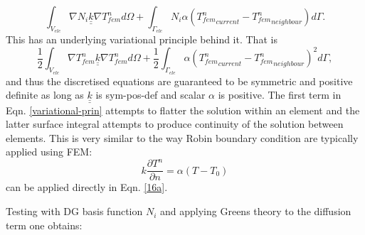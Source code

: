 \begin{equation}
\int_{V_{ele}} \nabla N_i {\underline {\underline k}} \nabla T_{fem}^n d\Omega 
+\int_{\Gamma_{ele}} N_i \alpha \left({T_{fem}^n}_{current}-{T_{fem}^n}_{neighbour} \right)  d\Gamma . 
\label{dg-variational-diff-low} 
\end{equation}
This has an underlying variational principle behind it. That is 
\begin{equation}
\frac{1}{2}
\int_{V_{ele}} \nabla T_{fem}^n {\underline {\underline k}} \nabla T_{fem}^n d\Omega 
+\frac{1}{2} 
\int_{\Gamma_{ele}} \alpha \left({{T_{fem}^n}_{current}-{T_{fem}^n}_{neighbour}} \right)^2 
d\Gamma, 
\label{variational-prin} 
\end{equation}
 and 
thus the discretised equations are guaranteed to be symmetric and positive definite as long as ${\underline {\underline k}}$ is sym-pos-def and scalar $\alpha$ is positive. The first term in Eqn. \ref{variational-prin} attempts to flatter the solution within an element and the latter surface integral attempts to produce continuity of the solution between elements. This is very similar to the way Robin boundary condition are typically applied using FEM: 
\begin{displaymath}
k \frac{\partial T^{n}}{\partial n} = \alpha (T - T_{0})
\end{displaymath}
can be applied directly in Eqn. \ref{16a}.

Testing with DG basis function $N_i$ and applying Greens theory to the diffusion term one obtains: 

